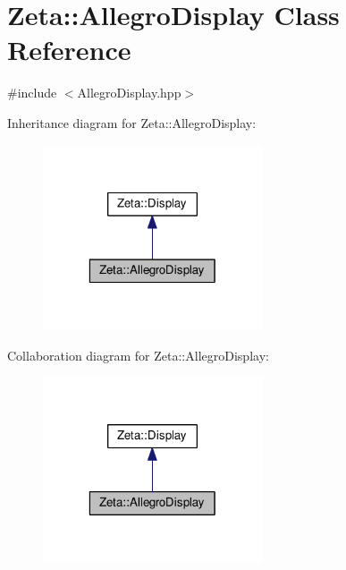 \hypertarget{classZeta_1_1AllegroDisplay}{\section{Zeta\+:\+:Allegro\+Display Class Reference}
\label{classZeta_1_1AllegroDisplay}
}


{\ttfamily \#include $<$Allegro\+Display.\+hpp$>$}



Inheritance diagram for Zeta\+:\+:Allegro\+Display\+:\nopagebreak
\begin{figure}[H]
\begin{center}
\leavevmode
\includegraphics[width=184pt]{classZeta_1_1AllegroDisplay__inherit__graph}
\end{center}
\end{figure}


Collaboration diagram for Zeta\+:\+:Allegro\+Display\+:\nopagebreak
\begin{figure}[H]
\begin{center}
\leavevmode
\includegraphics[width=184pt]{classZeta_1_1AllegroDisplay__coll__graph}
\end{center}
\end{figure}
